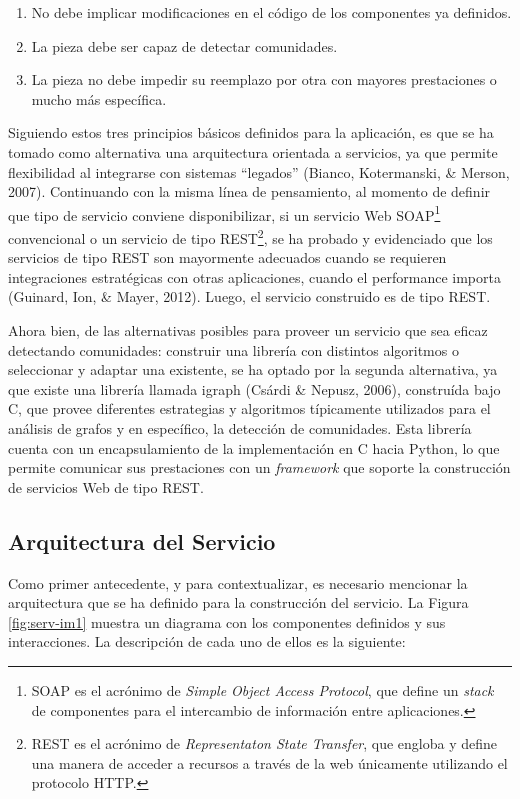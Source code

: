 \begin{enumerate}[I]
  \item{No debe implicar modificaciones en el código de los componentes ya definidos.}
  \item{La pieza debe ser capaz de detectar comunidades.}
  \item{La pieza no debe impedir su reemplazo por otra con mayores prestaciones o mucho más específica.}
\end{enumerate}

Siguiendo estos tres principios básicos definidos para la aplicación, es que se ha tomado como alternativa una arquitectura orientada a servicios, ya que permite flexibilidad al integrarse con sistemas “legados” (Bianco, Kotermanski, & Merson, 2007).  Continuando con la misma línea de pensamiento, al momento de definir que tipo de servicio conviene disponibilizar, si un servicio Web SOAP\footnote{SOAP es el acrónimo de \textit{Simple Object Access Protocol}, que define un \textit{stack} de componentes para el intercambio de información entre aplicaciones.} convencional o un servicio de tipo REST\footnote{REST es el acrónimo de \textit{Representaton State Transfer}, que engloba y define una manera de acceder a recursos a través de la web únicamente utilizando el protocolo HTTP.}, se ha probado y evidenciado que los servicios de tipo REST son mayormente adecuados cuando se requieren integraciones estratégicas con otras aplicaciones, cuando el performance importa (Guinard, Ion, & Mayer, 2012). Luego, el servicio construido es de tipo REST.

Ahora bien, de las alternativas posibles para proveer un servicio que sea eficaz detectando comunidades: construir una librería con distintos algoritmos o seleccionar y adaptar una existente, se ha optado por la segunda alternativa, ya que existe una librería llamada igraph (Csárdi & Nepusz, 2006), construída bajo C, que provee diferentes estrategias y algoritmos típicamente utilizados para el análisis de grafos y en específico, la detección de comunidades. Esta librería cuenta con un encapsulamiento de la implementación en C hacia Python, lo que permite comunicar sus prestaciones con un \textit{framework} que soporte la construcción de servicios Web de tipo REST.

\subsection{Arquitectura del Servicio}

Como primer antecedente, y para contextualizar, es necesario mencionar la arquitectura que se ha definido para la construcción del servicio. La Figura \ref{fig:serv-im1} muestra un diagrama con los componentes definidos y sus interacciones. La descripción de cada uno de ellos es la siguiente:

